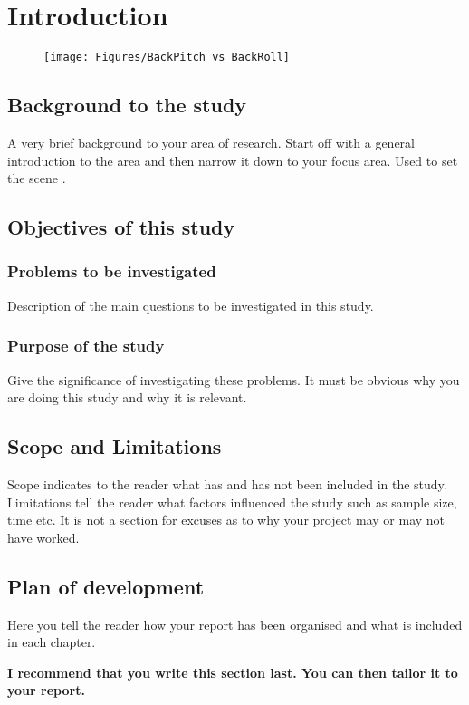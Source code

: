 \chapter{Introduction}

\begin{figure}
	\centering
	\texttt{[image: Figures/BackPitch\_vs\_BackRoll]}
\end{figure}
\section{Background to the study}
A very brief background to your area of research. Start off with a general introduction to the area and
then narrow it down to your focus area. Used to set the scene \cite{smt2011}.
\section{Objectives of this study}
\subsection{Problems to be investigated}
Description of the main questions to be investigated in this study.
\subsection{Purpose of the study}
Give the significance of investigating these problems. It must be obvious why you are doing this study
and why it is relevant.

\section{Scope and Limitations}
Scope indicates to the reader what has and has not been included in the study. Limitations tell the
reader what factors influenced the study such as sample size, time etc. It is not a section for excuses as
to why your project may or may not have worked.

\section{Plan of development}
Here you tell the reader how your report has been organised and what is included in each
chapter.

{\bf I recommend that you write this section last. You can then tailor it to your report.}
